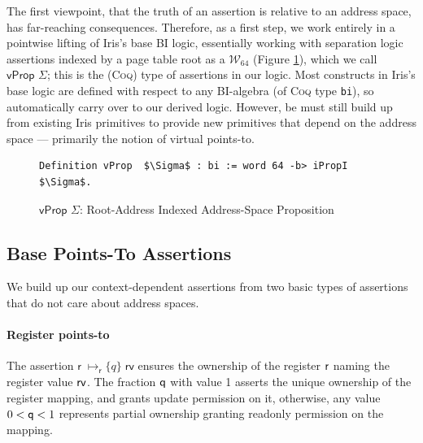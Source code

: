 The first viewpoint, that the truth of an assertion is relative to an address space, has far-reaching consequences.
Therefore, as a first step, we work entirely in a pointwise lifting of Iris's base BI logic,
essentially working with separation logic assertions indexed by a page table root as a $\mathcal{W}_{64}$
(Figure \ref{fig:vprop}), which we call $\textsf{vProp }\Sigma$; this is the (\textsc{Coq}) type of assertions in our logic.
Most constructs in Iris's base logic are defined with respect to any BI-algebra (of \textsc{Coq} type \lstinline|bi|), so automatically
carry over to our derived logic.
However, be must still build up from existing Iris primitives to provide new primitives that depend on the address space --- primarily the notion
of virtual points-to.

\begin{figure}[t]
\begin{lstlisting}[language=Coq]
  Definition vProp  $\Sigma$ : bi := word 64 -b> iPropI  $\Sigma$.
  \end{lstlisting}
\caption{$\textsf{vProp }\Sigma$: Root-Address Indexed Address-Space Proposition}
  \label{fig:vprop}
\end{figure}

\subsection{Base Points-To Assertions}
\label{sec:pointsto}
We build up our context-dependent assertions from two basic types of assertions that do not care about address spaces.

\paragraph{Register points-to} 
The assertion $\textsf{r}\;\mapsto_{\textsf{r}}\{q\}\;\textsf{rv}$ ensures the ownership of the register $\mathsf{r}$ naming the register value $\mathsf{rv}$. 
The fraction $\mathsf{q}$ with value 1 asserts the unique ownership of the register mapping, and grants update permission on it, 
otherwise, any value $0 < \mathsf{q} <1$ represents partial ownership granting readonly permission on the mapping.

